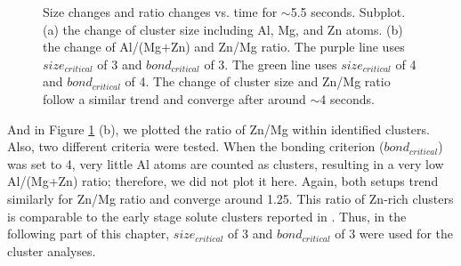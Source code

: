 \begingroup
\begin{figure}[!ht]
  \centering
\caption[Size changes and ratio changes vs. time for $\sim$5.5 seconds. ]{Size changes and ratio changes vs. time for $\sim$5.5 seconds. Subplot. (a) the change of cluster size including Al, Mg, and Zn atoms. (b) the change of Al/(Mg+Zn) and Zn/Mg ratio. The purple line uses $size_{critical}$ of 3 and $bond_{critical}$ of 3. The green line uses $size_{critical}$ of 4 and $bond_{critical}$ of 4. The change of cluster size and Zn/Mg ratio follow a similar trend and converge after around $\sim$4 seconds.}
\label{Chap:Al/Vac:fig:Al_Mg_Zn_benchmark}
\end{figure}
\endgroup

And in Figure \ref{Chap:Al/Vac:fig:Al_Mg_Zn_benchmark} (b), we plotted the ratio of Zn/Mg within identified clusters. Also, two different criteria were tested. When the bonding criterion ($bond_{critical}$) was set to 4, very little Al atoms are counted as clusters, resulting in a very low Al/(Mg+Zn) ratio; therefore, we did not plot it here. Again, both setups trend similarly for Zn/Mg ratio and converge around 1.25. This ratio of Zn-rich clusters is comparable to the early stage solute clusters reported in \cite{liu2020formation}. Thus, in the following part of this chapter, $size_{critical}$ of 3 and $bond_{critical}$ of 3 were used for the cluster analyses. 

